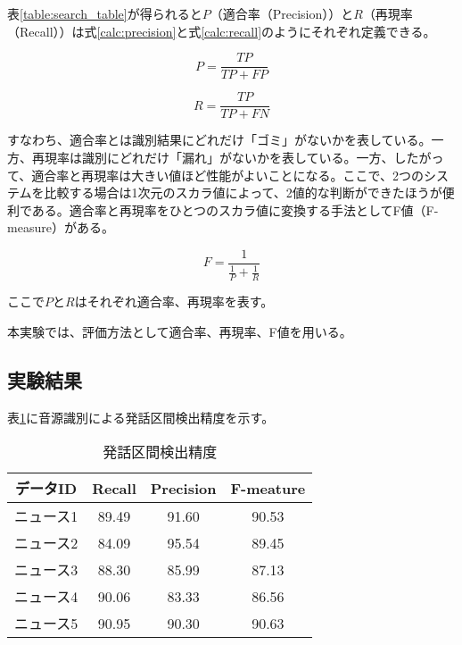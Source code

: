 表\ref{table:search_table}が得られると$P$（適合率（Precision））と$R$（再現率（Recall））は式\ref{calc:precision}と式\ref{calc:recall}のようにそれぞれ定義できる。

\begin{equation}
\label{calc:precision}
P = \frac{TP}{TP + FP}
\end{equation}

\begin{equation}
\label{calc:recall}
R = \frac{TP}{TP + FN}
\end{equation}

すなわち、適合率とは識別結果にどれだけ「ゴミ」がないかを表している。一方、再現率は識別にどれだけ「漏れ」がないかを表している。一方、したがって、適合率と再現率は大きい値ほど性能がよいことになる。ここで、2つのシステムを比較する場合は1次元のスカラ値によって、2値的な判断ができたほうが便利である。適合率と再現率をひとつのスカラ値に変換する手法としてF値（F-measure）がある。

\begin{equation}
\label{calc:fmeasure}
F = \frac{1}{\frac{1}{P} + \frac{1}{R}}
\end{equation}

ここで$P$と$R$はそれぞれ適合率、再現率を表す。\par
本実験では、評価方法として適合率、再現率、F値を用いる。
\subsection{実験結果}
表\ref{table:test_detail_RPF}に音源識別による発話区間検出精度を示す。

\begin{table}[H]
  \begin{center}
    \caption{発話区間検出精度 \label{table:test_detail_RPF}}
    \begin{tabular}{|c||c|c|c|} \hline
      データID & Recall & Precision & F-meature \\ \hline
      ニュース1 & 89.49 & 91.60 & 90.53 \\ \hline
      ニュース2 & 84.09 & 95.54 & 89.45\\ \hline
      ニュース3 & 88.30 & 85.99 & 87.13 \\ \hline
      ニュース4 & 90.06 & 83.33 & 86.56\\ \hline
      ニュース5 & 90.95 & 90.30 & 90.63\\ \hline
    \end{tabular}
  \end{center}
\end{table}

